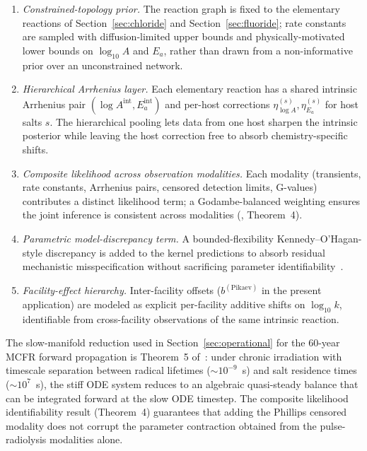 \documentclass[11pt]{article}
\theoremstyle{plain}
\theoremstyle{definition}
\theoremstyle{remark}
\newcommand{\Ea}{E_a}
\begin{document}
\begin{enumerate}
\item \emph{Constrained-topology prior.}  The reaction graph is fixed to
      the elementary reactions of Section~\ref{sec:chloride} and
      Section~\ref{sec:fluoride}; rate constants are sampled with
      diffusion-limited upper bounds and physically-motivated lower bounds
      on $\log_{10}A$ and $\Ea$, rather than drawn from a non-informative
      prior over an unconstrained network.
\item \emph{Hierarchical Arrhenius layer.}  Each elementary reaction has a
      shared intrinsic Arrhenius pair $(\log A^{\mathrm{int}}, \Ea^{\mathrm{int}})$
      and per-host corrections $\eta^{(s)}_{\log A}, \eta^{(s)}_{\Ea}$ for
      host salts $s$.  The hierarchical pooling lets data from one host
      sharpen the intrinsic posterior while leaving the host correction
      free to absorb chemistry-specific shifts.
\item \emph{Composite likelihood across observation modalities.}  Each
      modality (transients, rate constants, Arrhenius pairs, censored
      detection limits, G-values) contributes a distinct likelihood term;
      a Godambe-balanced weighting ensures the joint inference is
      consistent across modalities (\citealp{Tanore2026PaperI}, Theorem~4).
\item \emph{Parametric model-discrepancy term.}  A bounded-flexibility
      Kennedy--O'Hagan-style discrepancy is added to the kernel predictions
      to absorb residual mechanistic misspecification without sacrificing
      parameter identifiability~\citep{KennedyOHagan2001,Brynjarsdottir2014}.
\item \emph{Facility-effect hierarchy.}  Inter-facility offsets
      ($b^{(\mathrm{Pikaev})}$ in the present application) are modeled as
      explicit per-facility additive shifts on $\log_{10}\!k$, identifiable
      from cross-facility observations of the same intrinsic reaction.
\end{enumerate}

The slow-manifold reduction used in Section~\ref{sec:operational} for the
60-year MCFR forward propagation is Theorem~5 of~\citet{Tanore2026PaperI}:
under chronic irradiation with timescale separation between radical
lifetimes ($\sim\!10^{-9}$~s) and salt residence times ($\sim\!10^{7}$~s),
the stiff ODE system reduces to an algebraic quasi-steady balance that can
be integrated forward at the slow ODE timestep.  The composite likelihood
identifiability result (Theorem~4) guarantees that adding the Phillips
censored modality does not corrupt the parameter contraction obtained
from the pulse-radiolysis modalities alone.
\end{document}
